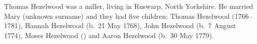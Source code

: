
Thomas Hezelwood was a miller, living in Ruswarp, North Yorkshire. He married Mary (unknown surname) and they had five children: Thomas Hezelwood (1766--1781), Hannah Hezelwood (b.\ 21 May 1768), John Hezelwood (b.\ 7 August 1774), Moses Hezelwood () and Aaron Hezelwood (b.\ 30 May 1779). \cite{THezelwoodChildren}
